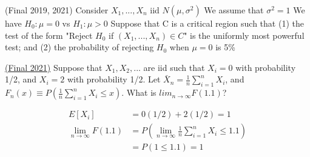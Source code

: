 \documentclass[answers]{exam}
\begin{document}
\begin{questions}

\question (Final 2019, 2021) Consider $X_1,...,X_n$ iid $N(\mu,\sigma^2)$ We assume that $\sigma^2 = 1$ We have $H_0 : \mu = 0$ vs $H_1 : \mu > 0$ Suppose that C is a critical region such that (1) the test of the form "Reject $H_0$ if $(X_1,...,X_n) \in C$" is the uniformly most powerful test; and (2) the probability of rejecting $H_0$ when $\mu = 0$ is 5\%

\question \href{https://drive.google.com/drive/folders/1f3rKaHYUMvUB4_RBHUFTtTVIzO9osoP4}{(Final 2021)} Suppose that $X_1,X_2,...$ are iid such that $X_i = 0$ with probability 1/2, and $X_i = 2$ with probability 1/2. Let $\bar{X}_n = \frac{1}{n} \sum_{i=1}^n X_i$, and $F_n(x) \equiv P(\frac{1}{n}\sum_{i=1}^n X_i \leq x)$. What is $lim_{n \to \infty} F(1.1)$?
\begin{solution}
    \begin{align*}
        E[X_i] &= 0(1/2) + 2(1/2) = 1\\
        \lim_{n \to \infty} F(1.1) &=  P( \lim_{n \to \infty}\frac{1}{n}\sum_{i=1}^n X_i \leq 1.1)\\
        &= P(1 \leq 1.1) = 1
    \end{align*}
\end{solution}


\end{questions}
\end{document}
